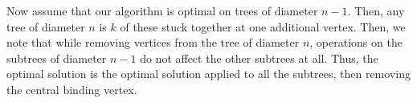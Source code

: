 \documentclass{article}
\begin{document}
Now assume that our algorithm is optimal on trees of diameter $n-1$. Then, any tree of diameter $n$ is $k$ of these stuck together at one additional vertex. Then, we note that while removing vertices from the tree of diameter $n$, operations on the subtrees of diameter $n-1$ do not affect the other subtrees at all. Thus, the optimal solution is the optimal solution applied to all the subtrees, then removing the central binding vertex.
\end{document}
